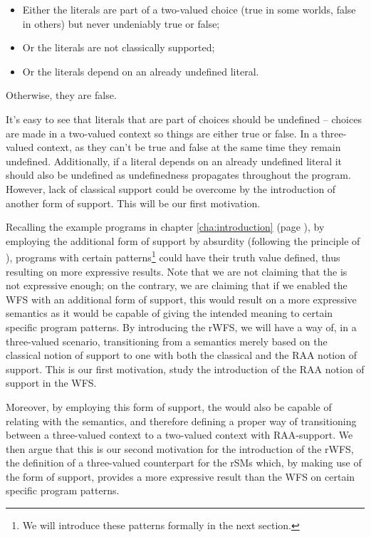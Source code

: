 \begin{itemize}
	\item Either the literals are part of a two-valued choice (true in some worlds, false in others) but never undeniably true or false;
	\item Or the literals are not classically supported;
	\item Or the literals depend on an already undefined literal.
\end{itemize}

Otherwise, they are false.

It's easy to see that literals that are part of choices should be undefined -- choices are made in a two-valued context so things are either true or false. In a three-valued context, as they can't be true and false at the same time they remain undefined. Additionally, if a literal depends on an already undefined literal it should also be undefined as undefinedness propagates throughout the program. However, lack of classical support could be overcome by the introduction of another form of support. This will be our first motivation.

Recalling the example programs in chapter \ref{cha:introduction} (page \pageref{cha:introduction}), by employing the additional form of support by absurdity (following the principle of \raa), programs with certain patterns\footnote{We will introduce these patterns formally in the next section.} could have their truth value defined, thus resulting on more expressive results. Note that we are not claiming that the \wfs is not expressive enough; on the contrary, we are claiming that if we enabled the WFS with an additional form of support, this would result on a more expressive semantics as it would be capable of giving the intended meaning to certain specific program patterns. By introducing the rWFS, we will have a way of, in a three-valued scenario, transitioning from a semantics merely based on the classical notion of support to one with both the classical and the RAA notion of support. This is our first motivation, study the introduction of the RAA notion of support in the WFS. 

Moreover, by employing this form of support, the \rwfs would also be capable of relating with the \rsms semantics, and therefore defining a proper way of transitioning between a three-valued context to a two-valued context with RAA-support. We then argue that this is our second motivation for the introduction of the rWFS, the definition of a three-valued counterpart for the rSMs which, by making use of the \raa form of support, provides a more expressive result than the WFS on certain specific program patterns.

